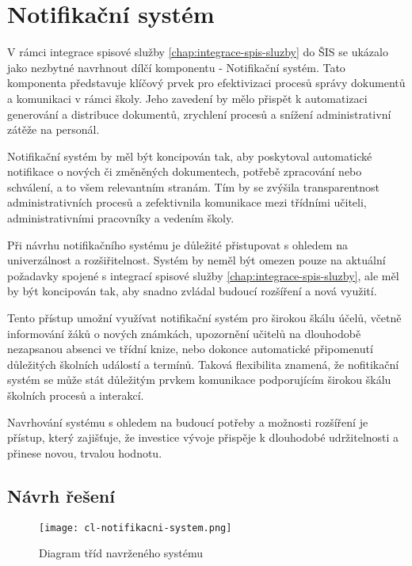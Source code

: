 \chapter{Notifikační systém}
V rámci integrace spisové služby \ref{chap:integrace-spis-sluzby} do ŠIS se ukázalo jako nezbytné navrhnout dílčí komponentu - Notifikační systém. Tato komponenta představuje klíčový prvek pro efektivizaci procesů správy dokumentů a komunikaci v rámci školy. Jeho zavedení by mělo přispět k automatizaci generování a distribuce dokumentů, zrychlení procesů a snížení administrativní zátěže na personál.

Notifikační systém by měl být koncipován tak, aby poskytoval automatické notifikace o nových či změněných dokumentech, potřebě zpracování nebo schválení, a to všem relevantním stranám. Tím by se zvýšila transparentnost administrativních procesů a zefektivnila komunikace mezi třídními učiteli, administrativními pracovníky a vedením školy.

Při návrhu notifikačního systému je důležité přistupovat s ohledem na univerzálnost a rozšiřitelnost. Systém by neměl být omezen pouze na aktuální požadavky spojené s integrací spisové služby \ref{chap:integrace-spis-sluzby}, ale měl by být koncipován tak, aby snadno zvládal budoucí rozšíření a nová využití.

Tento přístup umožní využívat notifikační systém pro širokou škálu účelů, včetně informování žáků o nových známkách, upozornění učitelů na dlouhodobě nezapsanou absenci ve třídní knize, nebo dokonce automatické připomenutí důležitých školních událostí a termínů. Taková flexibilita znamená, že nofitikační systém se může stát důležitým prvkem komunikace podporujícím širokou škálu školních procesů a interakcí.

Navrhování systému s ohledem na budoucí potřeby a možnosti rozšíření je přístup, který zajišťuje, že investice vývoje přispěje k dlouhodobé udržitelnosti a přinese novou, trvalou hodnotu.

\section{Návrh řešení}
\begin{landscape}
    \begin{figure}[H]
        \texttt{[image: cl-notifikacni-system.png]}
        \caption{Diagram tříd navrženého systému}
        \label{fig:cl-notifikacni-system}
    \end{figure}
\end{landscape}

